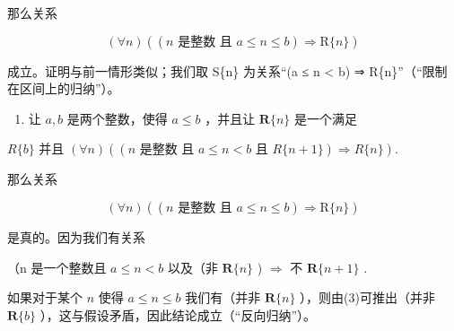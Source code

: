 那么关系

\[
(\forall n) ((n \text {   是整数   且   } a \leqslant n \leqslant b) \Longrightarrow \mathrm{R} \{n \})
\]

成立。证明与前一情形类似；我们取 S\{n\} 为关系“(a ≤ n \textless{} b) ⇒ R\{n\}''（“限制在区间上的归纳”）。

\begin{enumerate}
\def\labelenumi{(\arabic{enumi})}
\setcounter{enumi}{3}
\tightlist
\item
  让 \(a, b\) 是两个整数，使得 \(a \leqslant b\) ，并且让 \(\mathbf{R}\{n\}\) 是一个满足
\end{enumerate}

\(R\{b\}\) 并且 \((\forall n)((n \text{ 是整数 且 } a \leqslant n < b \text{ 且 } R\{n + 1\}) \Longrightarrow R\{n\}).\)

那么关系

\[
(\forall n) ((n \text {   是整数   且   } a \leqslant n \leqslant b) \Longrightarrow \mathrm{R} \{n \})
\]

是真的。因为我们有关系

（n 是一个整数且 \(a \leqslant n < b\) 以及（非 \(\mathbf{R}\{n\}\) ) \(\Longrightarrow\) 不 \(\mathbf{R}\{n + 1\}\) .

如果对于某个 \(n\) 使得 \(a \leqslant n \leqslant b\) 我们有（并非 \(\mathbf{R}\{n\}\) ），则由(3)可推出（并非 \(\mathbf{R}\{b\}\) ），这与假设矛盾，因此结论成立（“反向归纳”）。

